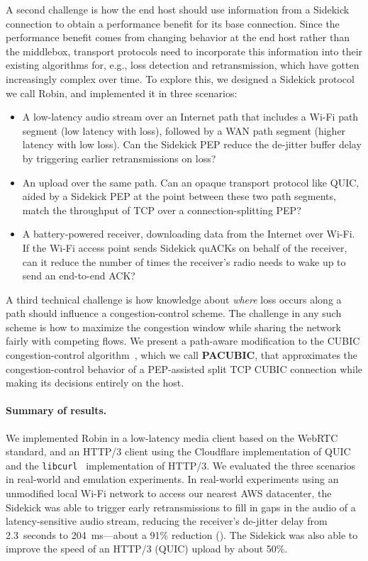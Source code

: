 A second challenge is how the end host should use information from a Sidekick
connection to obtain a performance benefit for its base connection. Since the
performance benefit comes from changing behavior at the end host rather than
the middlebox, transport protocols need to incorporate this information into
their existing algorithms for, e.g., loss detection and retransmission, which
have gotten increasingly complex over time. To explore this, we designed a
Sidekick protocol we call Robin, and implemented it in three scenarios:
\begin{itemize}[noitemsep,topsep=2pt]
\item A low-latency audio stream over an Internet path that includes a Wi-Fi path segment
  (low latency with loss), followed by a WAN path segment (higher latency
  with low loss). Can the Sidekick PEP reduce the de-jitter buffer delay
  by triggering earlier retransmissions on loss?

\item An upload over the same path. Can an opaque transport protocol like QUIC,
  aided by a Sidekick PEP at the point between these two path segments, match
  the throughput of TCP over a connection-splitting PEP?

\item A battery-powered receiver, downloading data from the Internet over Wi-Fi.
  If the Wi-Fi access point sends Sidekick quACKs on behalf of the receiver,
  can it reduce the number of times the receiver's radio needs to wake up
  to send an end-to-end ACK?
\end{itemize}

\smallskip

A third technical challenge is how knowledge about \emph{where}
loss occurs along a path should influence a congestion-control scheme.
The challenge in any such scheme is how to maximize the congestion window
while sharing the network fairly with competing flows.
We present a path-aware modification to the CUBIC congestion-control
algorithm~\cite{ha2008cubic}, which we call \mbox{\textbf{PACUBIC}},
that approximates the congestion-control behavior of a PEP-assisted split TCP
CUBIC connection while making its decisions entirely on the host.

\paragraph{Summary of results.}

We implemented Robin in a low-latency media client
based on the WebRTC standard, and an HTTP/3 client using the Cloudflare
implementation of QUIC~\cite{quiche} and the \texttt{libcurl}~\cite{libcurl}
implementation of HTTP/3. We evaluated the three scenarios in
real-world and emulation experiments.
In real-world experiments using an unmodified local Wi-Fi network to access our
nearest AWS datacenter, the Sidekick was able to trigger early retransmissions
to fill in gaps in the audio of a latency-sensitive audio stream, reducing the
receiver's de-jitter delay from 2.3~seconds to 204~ms---about a 91\% reduction
(). The Sidekick was also able to improve the speed of an
HTTP/3 (QUIC) upload by about 50\%.

